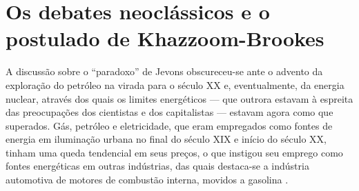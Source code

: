 




\section{Os debates neoclássicos e o postulado de Khazzoom-Brookes}
A discussão sobre o ``paradoxo'' de Jevons obscureceu-se ante o advento da exploração do petróleo na virada para o século XX e, eventualmente, da energia nuclear, através dos quais os limites energéticos --- que outrora estavam à espreita das preocupações dos cientistas e dos capitalistas --- estavam agora como que superados. Gás, petróleo e eletricidade, que eram empregados como fontes de energia em iluminação urbana no final do século XIX e início do século XX, tinham uma queda tendencial em seus preços, o que instigou seu emprego como fontes energéticas em outras indústrias, das quais destaca-se a indústria automotiva de motores de combustão interna, movidos a gasolina \parencite[p. 8-9]{Fouquet2009}. 


